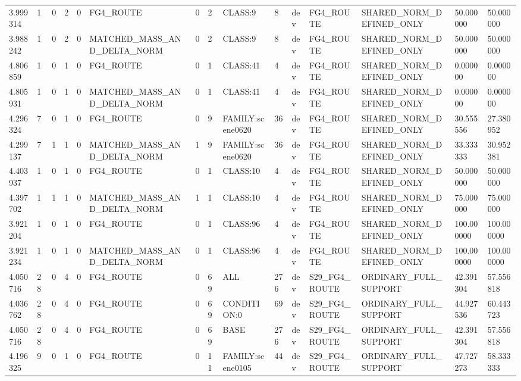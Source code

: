 \begin{tabular}{lllllllllllllll}
3.999314 & 1 & 0 & 2 & 0 & FG4\_ROUTE & 0 & 2 & CLASS:9 & 8 & dev & FG4\_ROUTE & SHARED\_NORM\_DEFINED\_ONLY & 50.000000 & 50.000000 \\
3.988242 & 1 & 0 & 2 & 0 & MATCHED\_MASS\_AND\_DELTA\_NORM & 0 & 2 & CLASS:9 & 8 & dev & FG4\_ROUTE & SHARED\_NORM\_DEFINED\_ONLY & 50.000000 & 50.000000 \\
4.806859 & 1 & 0 & 1 & 0 & FG4\_ROUTE & 0 & 1 & CLASS:41 & 4 & dev & FG4\_ROUTE & SHARED\_NORM\_DEFINED\_ONLY & 0.000000 & 0.000000 \\
4.805931 & 1 & 0 & 1 & 0 & MATCHED\_MASS\_AND\_DELTA\_NORM & 0 & 1 & CLASS:41 & 4 & dev & FG4\_ROUTE & SHARED\_NORM\_DEFINED\_ONLY & 0.000000 & 0.000000 \\
4.296324 & 7 & 0 & 1 & 0 & FG4\_ROUTE & 0 & 9 & FAMILY:scene0620 & 36 & dev & FG4\_ROUTE & SHARED\_NORM\_DEFINED\_ONLY & 30.555556 & 27.380952 \\
4.299137 & 7 & 1 & 1 & 0 & MATCHED\_MASS\_AND\_DELTA\_NORM & 1 & 9 & FAMILY:scene0620 & 36 & dev & FG4\_ROUTE & SHARED\_NORM\_DEFINED\_ONLY & 33.333333 & 30.952381 \\
4.403937 & 1 & 0 & 1 & 0 & FG4\_ROUTE & 0 & 1 & CLASS:10 & 4 & dev & FG4\_ROUTE & SHARED\_NORM\_DEFINED\_ONLY & 50.000000 & 50.000000 \\
4.397702 & 1 & 1 & 1 & 0 & MATCHED\_MASS\_AND\_DELTA\_NORM & 1 & 1 & CLASS:10 & 4 & dev & FG4\_ROUTE & SHARED\_NORM\_DEFINED\_ONLY & 75.000000 & 75.000000 \\
3.921204 & 1 & 0 & 1 & 0 & FG4\_ROUTE & 0 & 1 & CLASS:96 & 4 & dev & FG4\_ROUTE & SHARED\_NORM\_DEFINED\_ONLY & 100.000000 & 100.000000 \\
3.921234 & 1 & 0 & 1 & 0 & MATCHED\_MASS\_AND\_DELTA\_NORM & 0 & 1 & CLASS:96 & 4 & dev & FG4\_ROUTE & SHARED\_NORM\_DEFINED\_ONLY & 100.000000 & 100.000000 \\
4.050716 & 28 & 0 & 4 & 0 & FG4\_ROUTE & 0 & 69 & ALL & 276 & dev & S29\_FG4\_ROUTE & ORDINARY\_FULL\_SUPPORT & 42.391304 & 57.556818 \\
4.036762 & 28 & 0 & 4 & 0 & FG4\_ROUTE & 0 & 69 & CONDITION:0 & 69 & dev & S29\_FG4\_ROUTE & ORDINARY\_FULL\_SUPPORT & 44.927536 & 60.443723 \\
4.050716 & 28 & 0 & 4 & 0 & FG4\_ROUTE & 0 & 69 & BASE & 276 & dev & S29\_FG4\_ROUTE & ORDINARY\_FULL\_SUPPORT & 42.391304 & 57.556818 \\
4.196325 & 9 & 0 & 1 & 0 & FG4\_ROUTE & 0 & 11 & FAMILY:scene0105 & 44 & dev & S29\_FG4\_ROUTE & ORDINARY\_FULL\_SUPPORT & 47.727273 & 58.333333 \\

\end{tabular}
